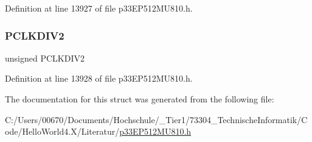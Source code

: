 Definition at line 13927 of file p33\+E\+P512\+M\+U810.\+h.

\mbox{\label{structtag_s_t_c_o_n2_b_i_t_s_a8ddd287d47ae49f7593f9e051fc67c00}} 
\subsubsection{\texorpdfstring{P\+C\+L\+K\+D\+I\+V2}{PCLKDIV2}}
{\footnotesize\ttfamily unsigned P\+C\+L\+K\+D\+I\+V2}



Definition at line 13928 of file p33\+E\+P512\+M\+U810.\+h.



The documentation for this struct was generated from the following file\+:\begin{DoxyCompactItemize}
\item 
C\+:/\+Users/00670/\+Documents/\+Hochschule/\+\_\+\+Tier1/73304\+\_\+\+Technische\+Informatik/\+Code/\+Hello\+World4.\+X/\+Literatur/\hyperlink{p33_e_p512_m_u810_8h}{p33\+E\+P512\+M\+U810.\+h}\end{DoxyCompactItemize}
